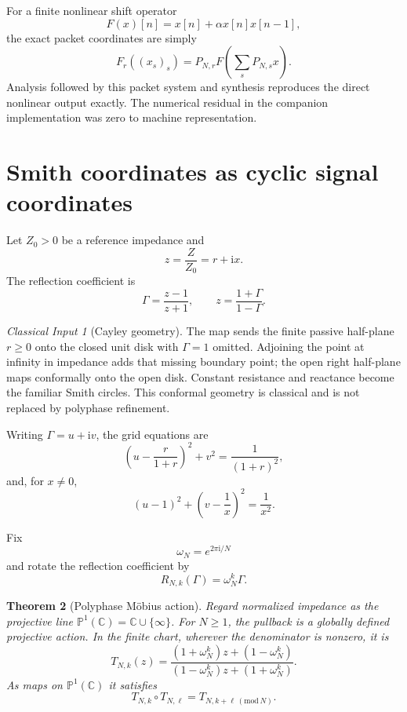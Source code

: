 \documentclass[11pt]{article}
\newtheorem{theorem}{Theorem}[section]
\theoremstyle{definition}
\theoremstyle{remark}
\newtheorem{classical}[theorem]{Classical Input}
\newcommand{\bbC}{\mathbb C}
\newcommand{\Gam}{\Gamma}
\newcommand{\ii}{\mathrm i}
\begin{document}
For a finite nonlinear shift operator
\[
F(x)[n]=x[n]+\alpha x[n]x[n-1],
\]
the exact packet coordinates are simply
\[
F_r((x_s)_s)=P_{N,r}F\!\left(\sum_sP_{N,s}x\right).
\]
Analysis followed by this packet system and synthesis reproduces the direct nonlinear output exactly. The numerical residual in the companion implementation was zero to machine representation.

\section{Smith coordinates as cyclic signal coordinates}

Let $Z_0>0$ be a reference impedance and
\[
z=\frac{Z}{Z_0}=r+\ii x.
\]
The reflection coefficient is
\[
\boxed{
\Gam=\frac{z-1}{z+1},
\qquad
z=\frac{1+\Gam}{1-\Gam}.
}
\]

\begin{classical}[Cayley geometry]
The map sends the finite passive half-plane $r\ge0$ onto the closed unit disk with $\Gam=1$ omitted. Adjoining the point at infinity in impedance adds that missing boundary point; the open right half-plane maps conformally onto the open disk. Constant resistance and reactance become the familiar Smith circles. This conformal geometry is classical and is not replaced by polyphase refinement.
\end{classical}

Writing $\Gam=u+\ii v$, the grid equations are
\[
\left(u-\frac{r}{1+r}\right)^2+v^2=\frac1{(1+r)^2},
\]
and, for $x\ne0$,
\[
(u-1)^2+\left(v-\frac1x\right)^2=\frac1{x^2}.
\]

Fix
\[
\omega_N=e^{2\pi\ii/N}
\]
and rotate the reflection coefficient by
\[
R_{N,k}(\Gam)=\omega_N^k\Gam.
\]

\begin{theorem}[Polyphase M\"obius action]\label{result:18}
Regard normalized impedance as the projective line $\mathbb P^1(\bbC)=\bbC\cup\{\infty\}$. For $N\ge1$, the pullback is a globally defined projective action. In the finite chart, wherever the denominator is nonzero, it is
\[
\boxed{
T_{N,k}(z)
=
\frac{(1+\omega_N^k)z+(1-\omega_N^k)}
{(1-\omega_N^k)z+(1+\omega_N^k)}.
}
\]
As maps on $\mathbb P^1(\bbC)$ it satisfies
\[
T_{N,k}\circ T_{N,\ell}=T_{N,k+\ell\, (\mathrm{mod}\,N)}.
\]
\end{theorem}
\end{document}
